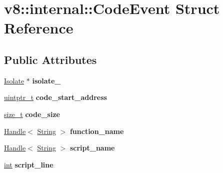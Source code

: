 \hypertarget{structv8_1_1internal_1_1CodeEvent}{}\section{v8\+:\+:internal\+:\+:Code\+Event Struct Reference}
\label{structv8_1_1internal_1_1CodeEvent}
\subsection*{Public Attributes}
\begin{DoxyCompactItemize}
\item 
\mbox{\label{structv8_1_1internal_1_1CodeEvent_ac1973d1f0bcf015d881e1bcb5c2af614}} 
\mbox{\hyperlink{classv8_1_1internal_1_1Isolate}{Isolate}} $\ast$ {\bfseries isolate\+\_\+}
\item 
\mbox{\label{structv8_1_1internal_1_1CodeEvent_a9c92bf8548ce762b89dba78aff23d063}} 
\mbox{\hyperlink{classuintptr__t}{uintptr\+\_\+t}} {\bfseries code\+\_\+start\+\_\+address}
\item 
\mbox{\label{structv8_1_1internal_1_1CodeEvent_a80d7efb0de1282cec0f91b0da2bc31f4}} 
\mbox{\hyperlink{classsize__t}{size\+\_\+t}} {\bfseries code\+\_\+size}
\item 
\mbox{\label{structv8_1_1internal_1_1CodeEvent_ad8ac0794016ebb6e9b72fec9a0af8c92}} 
\mbox{\hyperlink{classv8_1_1internal_1_1Handle}{Handle}}$<$ \mbox{\hyperlink{classv8_1_1internal_1_1String}{String}} $>$ {\bfseries function\+\_\+name}
\item 
\mbox{\label{structv8_1_1internal_1_1CodeEvent_aed24e54d60d623de54df13ac90e613e4}} 
\mbox{\hyperlink{classv8_1_1internal_1_1Handle}{Handle}}$<$ \mbox{\hyperlink{classv8_1_1internal_1_1String}{String}} $>$ {\bfseries script\+\_\+name}
\item 
\mbox{\label{structv8_1_1internal_1_1CodeEvent_a1214caafdf446c13eb503b7c34d0bb46}} 
\mbox{\hyperlink{classint}{int}} {\bfseries script\+\_\+line}
\item 
\mbox{\label{structv8_1_1internal_1_1CodeEvent_a46fcc6191cc993069a0d7f4ff6464672}} 

\end{DoxyCompactItemize}
